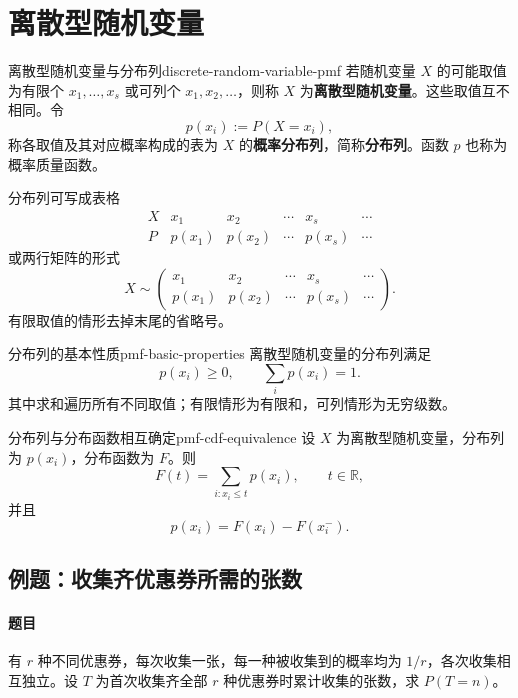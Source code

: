 \clearpage\section{离散型随机变量}\label{k:discrete}

\begin{mydefinition}{离散型随机变量与分布列}{discrete-random-variable-pmf}
若随机变量 $X$ 的可能取值为有限个 $x_1,\ldots,x_s$ 或可列个 $x_1,x_2,\ldots$，则称 $X$ 为\textbf{离散型随机变量}。这些取值互不相同。令
\[
p(x_i):=P(X=x_i),
\]
称各取值及其对应概率构成的表为 $X$ 的\textbf{概率分布列}，简称\textbf{分布列}。函数 $p$ 也称为概率质量函数。

分布列可写成表格
\[
\begin{array}{c|ccccc}
X&x_1&x_2&\cdots&x_s&\cdots\\ \hline
P&p(x_1)&p(x_2)&\cdots&p(x_s)&\cdots
\end{array}
\]
或两行矩阵的形式
\[
X\sim
\begin{pmatrix}
x_1&x_2&\cdots&x_s&\cdots\\
p(x_1)&p(x_2)&\cdots&p(x_s)&\cdots
\end{pmatrix}.
\]
有限取值的情形去掉末尾的省略号。
\end{mydefinition}

\begin{proposition}{分布列的基本性质}{pmf-basic-properties}
离散型随机变量的分布列满足
\[
p(x_i)\geq0,\qquad \sum_i p(x_i)=1.
\]
其中求和遍历所有不同取值；有限情形为有限和，可列情形为无穷级数。
\end{proposition}

\begin{proposition}{分布列与分布函数相互确定}{pmf-cdf-equivalence}
设 $X$ 为离散型随机变量，分布列为 $p(x_i)$，分布函数为 $F$。则
\[
F(t)=\sum_{i:x_i\leq t}p(x_i),\qquad t\in\mathbb R,
\]
并且
\[
p(x_i)=F(x_i)-F(x_i^-).
\]
\end{proposition}

\subsection{例题：收集齐优惠券所需的张数}\label{note:c2:e4}
\paragraph{题目}
有 $r$ 种不同优惠券，每次收集一张，每一种被收集到的概率均为 $1/r$，各次收集相互独立。设 $T$ 为首次收集齐全部 $r$ 种优惠券时累计收集的张数，求 $P(T=n)$。

